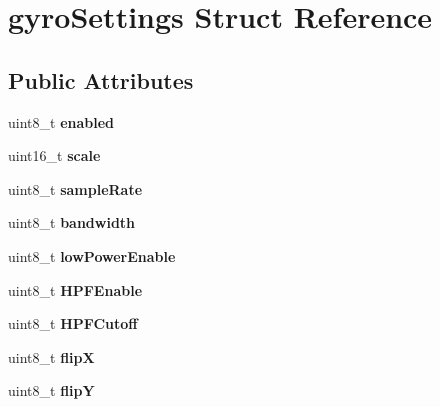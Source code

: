 \hypertarget{structgyroSettings}{}\section{gyro\+Settings Struct Reference}
\label{structgyroSettings}
\subsection*{Public Attributes}
\begin{DoxyCompactItemize}
\item 
uint8\+\_\+t {\bfseries enabled}\hypertarget{structgyroSettings_ac9c769eeefed971baac74a7b81b25e7b}{}\label{structgyroSettings_ac9c769eeefed971baac74a7b81b25e7b}

\item 
uint16\+\_\+t {\bfseries scale}\hypertarget{structgyroSettings_a70ced5c47e97d4dd6770954117ad3a9f}{}\label{structgyroSettings_a70ced5c47e97d4dd6770954117ad3a9f}

\item 
uint8\+\_\+t {\bfseries sample\+Rate}\hypertarget{structgyroSettings_a58ebac4d1f242d6b129570396a7355b0}{}\label{structgyroSettings_a58ebac4d1f242d6b129570396a7355b0}

\item 
uint8\+\_\+t {\bfseries bandwidth}\hypertarget{structgyroSettings_ac3f0782333ec55165c1f589d445ba374}{}\label{structgyroSettings_ac3f0782333ec55165c1f589d445ba374}

\item 
uint8\+\_\+t {\bfseries low\+Power\+Enable}\hypertarget{structgyroSettings_a296a167235d876fa79afc471399e763b}{}\label{structgyroSettings_a296a167235d876fa79afc471399e763b}

\item 
uint8\+\_\+t {\bfseries H\+P\+F\+Enable}\hypertarget{structgyroSettings_aa7aa5eba55588e4bcfc0be9ea9b6ed8d}{}\label{structgyroSettings_aa7aa5eba55588e4bcfc0be9ea9b6ed8d}

\item 
uint8\+\_\+t {\bfseries H\+P\+F\+Cutoff}\hypertarget{structgyroSettings_a7357a9b858fdf515e969ae4e06459f37}{}\label{structgyroSettings_a7357a9b858fdf515e969ae4e06459f37}

\item 
uint8\+\_\+t {\bfseries flipX}\hypertarget{structgyroSettings_a877b529e39287bed155acbca97a75540}{}\label{structgyroSettings_a877b529e39287bed155acbca97a75540}

\item 
uint8\+\_\+t {\bfseries flipY}\hypertarget{structgyroSettings_a2137659e07899a0efccc941e003c07e0}{}\label{structgyroSettings_a2137659e07899a0efccc941e003c07e0}


\end{DoxyCompactItemize}
